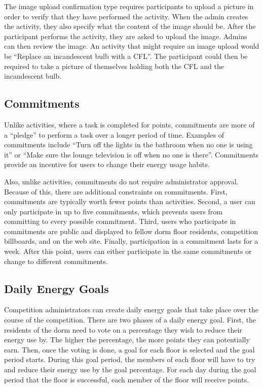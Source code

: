 The image upload confirmation type requires participants to upload a picture in order to verify that they have performed the activity.  When the admin creates the activity, they also specify what the content of the image should be.  After the participant performs the activity, they are asked to upload the image.  Admins can then review the image.  An activity that might require an image upload would be ``Replace an incandescent bulb with a CFL''.  The participant could then be required to take a picture of themselves holding both the CFL and the incandescent bulb.

\subsection{Commitments}

Unlike activities, where a task is completed for points, commitments are more of a ``pledge'' to perform a task over a longer period of time.  Examples of commitments include ``Turn off the lights in the bathroom when no one is using it'' or ``Make sure the lounge television is off when no one is there''.  Commitments provide an incentive for users to change their energy usage habits.

Also, unlike activities, commitments do not require administrator approval.  Because of this, there are additional constraints on commitments.  First, commitments are typically worth fewer points than activities.  Second, a user can only participate in up to five commitments, which prevents users from committing to every possible commitment.  Third, users who participate in commitments are public and displayed to fellow dorm floor residents, competition billboards, and on the web site.  Finally, participation in a commitment lasts for a week.  After this point, users can either participate in the same commitments or change to different commitments.

\subsection{Daily Energy Goals}

Competition administrators can create daily energy goals that take place over the course of the competition.  There are two phases of a daily energy goal.  First, the residents of the dorm need to vote on a percentage they wish to reduce their energy use by.  The higher the percentage, the more points they can potentially earn.  Then, once the voting is done, a goal for each floor is selected and the goal period starts.  During this goal period, the members of each floor will have to try and reduce their energy use by the goal percentage.  For each day during the goal period that the floor is successful, each member of the floor will receive points.


